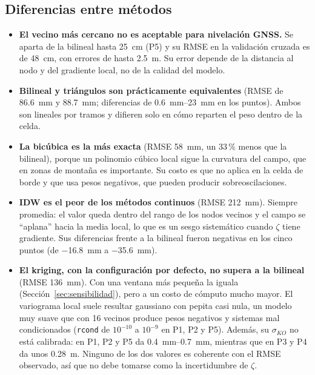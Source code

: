 \documentclass[11pt,letterpaper]{article}
\begin{document}
\subsection{Diferencias entre métodos}
\begin{itemize}
    \item \textbf{El vecino más cercano no es aceptable para nivelación GNSS.} Se aparta de
    la bilineal hasta \SI{25}{cm} (P5) y su RMSE en la validación cruzada es de
    \SI{48}{cm}, con errores de hasta \SI{2.5}{m}. Su error depende de la distancia
    al nodo y del gradiente local, no de la calidad del modelo.
    \item \textbf{Bilineal y triángulos son prácticamente equivalentes} (RMSE de \SI{86.6}{mm}
    y \SI{88.7}{mm}; diferencias de \SIrange{0.6}{23}{mm} en los puntos). Ambos son lineales
    por tramos y difieren solo en cómo reparten el peso dentro de la celda.
    \item \textbf{La bicúbica es la más exacta} (RMSE \SI{58}{mm}, un 33\,\% menos que la
    bilineal), porque un polinomio cúbico local sigue la curvatura del campo, que en zonas
    de montaña es importante. Su costo es que no aplica en la celda de borde y que usa pesos
    negativos, que pueden producir sobreoscilaciones.
    \item \textbf{IDW es el peor de los métodos continuos} (RMSE \SI{212}{mm}). Siempre
    promedia: el valor queda dentro del rango de los nodos vecinos y el campo se ``aplana''
    hacia la media local, lo que es un sesgo sistemático cuando $\zeta$ tiene gradiente. Sus
    diferencias frente a la bilineal fueron negativas en los cinco puntos (de \SI{-16.8}{mm} a
    \SI{-35.6}{mm}).
    \item \textbf{El kriging, con la configuración por defecto, no supera a la bilineal}
    (RMSE \SI{136}{mm}). Con una ventana más pequeña la iguala
    (Sección~\ref{sec:sensibilidad}), pero a un costo de cómputo mucho mayor. El variograma local suele resultar gaussiano con pepita casi nula, un
    modelo muy suave que con 16 vecinos produce pesos negativos y sistemas mal condicionados
    (\texttt{rcond} de $10^{-10}$ a $10^{-9}$ en P1, P2 y P5). Además, su $\sigma_{KO}$ no está calibrada: en
    P1, P2 y P5 da \SIrange{0.4}{0.7}{mm}, mientras que en P3 y P4 da unos \SI{0.28}{m}.
    Ninguno de los dos valores es coherente con el RMSE observado, así que no debe tomarse
    como la incertidumbre de $\zeta$.
\end{itemize}
\end{document}
